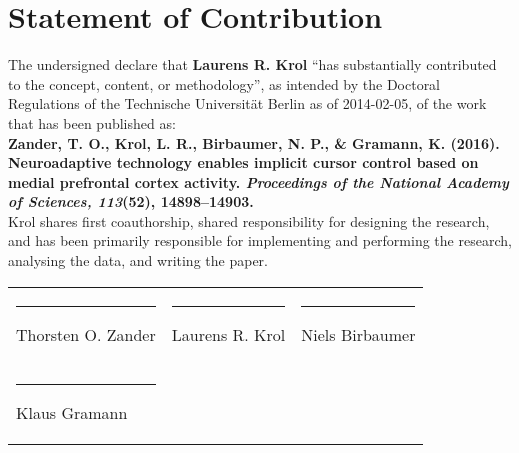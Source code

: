 \documentclass[a4paper,12pt]{article}
\title{}
\author{}
\date{}
\begin{document}
\thispagestyle{empty}

\section*{Statement of Contribution}

The undersigned declare that \textbf{Laurens R. Krol} ``has substantially contributed to the concept, content, or methodology'', as intended by the Doctoral Regulations of the Technische Universität Berlin as of 2014-02-05, of the work that has been published as: \\

\textbf{Zander, T. O., Krol, L. R., Birbaumer, N. P., \& Gramann, K. (2016). Neuroadaptive technology enables implicit cursor control based on medial prefrontal cortex activity. \emph{Proceedings of the National Academy of Sciences, 113}(52), 14898–14903.} \\

Krol shares first coauthorship, shared responsibility for designing the research, and has been primarily responsible for implementing and performing the research, analysing the data, and writing the paper. \\

\begin{tabularx}{\textwidth}{XXX}
\vspace{2cm} \hrule Thorsten O. Zander & \vspace{2cm} \hrule Laurens R. Krol & \vspace{2cm} \hrule Niels Birbaumer \\
\vspace{2cm} \hrule Klaus Gramann &  & 
\end{tabularx}
\end{document}
